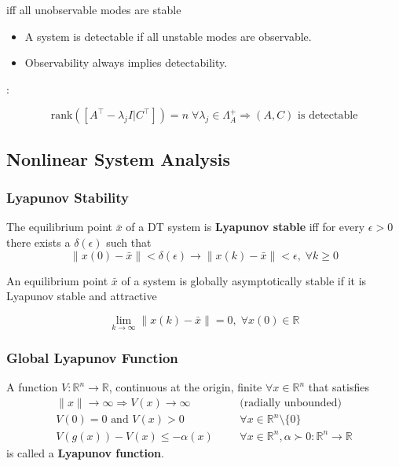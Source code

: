 iff all unobservable modes are stable
\begin{itemize}
    \item A system is detectable if all unstable modes are observable.
    \item Observability always implies detectability.
\end{itemize}

\newpar{}
:

\noindent\begin{equation*}
    \text{rank}\left(\left[A^{\top}-\lambda_{j}I|C^{\top}\right]\right)=n\;\forall\lambda_{j}\in\Lambda_{A}^{+}\Rightarrow (A,C) \text{ is detectable}
\end{equation*}


\subsection{Nonlinear System Analysis}
\subsubsection{Lyapunov Stability}
The equilibrium point $\bar{x}$ of a DT system is \textbf{Lyapunov stable} iff for every $\epsilon >0$ there exists a $\delta(\epsilon)$ such that
\begin{equation*}
    \lVert x(0) - \bar{x} \rVert < \delta(\epsilon) \to \lVert x(k) - \bar{x} \rVert < \epsilon, \; \forall k \geq 0
\end{equation*}

\newpar{}

An equilibrium point $\bar{x}$ of a system is globally asymptotically stable if it is Lyapunov stable and attractive

\begin{equation*}
    \lim_{k\to\infty} \lVert x(k) - \bar{x} \rVert = 0, \; \forall x(0) \in \mathbb{R}
\end{equation*}

\subsubsection{Global Lyapunov Function}
A function $V:\mathbb{R}^n\to \mathbb{R}$, continuous at the origin, finite $\forall x \in \mathbb{R}^n$ that satisfies
\begin{align*}
    \lVert x \rVert \to \infty \Rightarrow V(x)  \to \infty      &  &  & \text{(radially unbounded)}                                         \\
    V(0)=0 \text{ and } V(x)                     >0              &  &  & \forall x \in \mathbb{R}^n \setminus\{0\}                           \\
    V(g(x)) - V(x)                               \leq -\alpha(x) &  &  & \forall x \in \mathbb{R}^n, \alpha\succ0:\mathbb{R}^n\to \mathbb{R}
\end{align*}
is called a \textbf{Lyapunov function}.

